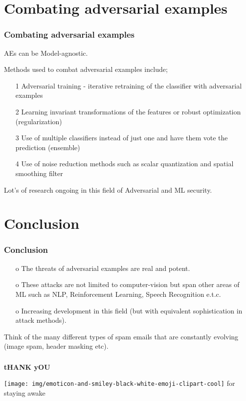 \documentclass[12pt]{beamer}
\begin{document}
\section{Combating adversarial examples}
\begin{frame}
\frametitle{Combating adversarial examples}

AEs can be Model-agnostic.

Methods used to combat adversarial examples include\protect\footnotemark;
\begin{itemize}
	\item[1] Adversarial training - iterative retraining of the classifier with adversarial examples \pause
	\item[2] Learning invariant transformations of the features or robust optimization (regularization) \pause
	\item[3] Use of multiple classifiers instead of just one and have them vote the prediction (ensemble) \pause
	\item[4] Use of noise reduction methods such as scalar quantization and
spatial smoothing filter \protect\footnotemark 
\end{itemize}
{\small Lot's of research ongoing in this field of Adversarial and ML security.}

\end{frame}

\section{Conclusion}
\begin{frame}
\frametitle{Conclusion}
\begin{itemize}
	\item[o] The threats of adversarial examples are real and potent.
	\item[o] These attacks are not limited to computer-vision but span other areas of ML such as NLP, Reinforcement Learning, Speech Recognition e.t.c.
	\item[o] Increasing development in this field (but with equivalent sophistication in attack methods).
\end{itemize}
 
Think of the many different types of spam emails that are constantly evolving (image spam, header masking etc).
\end{frame}

\begin{frame}
\frametitle{}
\begin{center}
	\textbf{{\Huge tHANK yOU}}
\end{center}
\begin{center}
	\texttt{[image: img/emoticon-and-smiley-black-white-emoji-clipart-cool]}
	{\Large for staying awake}
\end{center}

\end{frame}
\end{document}
